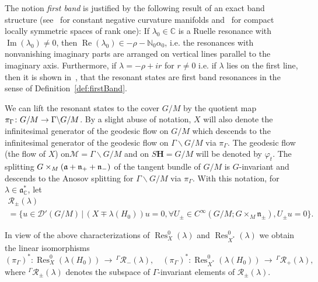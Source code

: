 \documentclass[AHL, Unicode, longabstracts, published]{cedram}
\DeclareMathOperator{\Res}{Res}
\DeclareMathOperator{\Imag}{Im}
\DeclareMathOperator{\Real}{Re}
\newcommand{\mc}{\mathcal}
\newcommand{\cc}{\mathbb{C}}
\newcommand{\bfh}{\mathbf{H}}
\newcommand{\N}{\mathbb{N}}
\renewcommand{\a}{\mathfrak a}
\let\oldforall\forall
\renewcommand*{\forall}{\mathrel{\oldforall}}
\begin{document}
\begin{rema}
The notion \emph{first band} is justified by the following result of an exact band structure (see~\cite{DFG15} for constant negative curvature manifolds and~\cite{KW19a} for compact locally symmetric spaces of rank one): If $\lambda_0\in \cc$ is a Ruelle resonance with $\Imag(\lambda_0)\neq 0$, then $\Real(\lambda_0) \in -\rho - \N_0\alpha_0$, i.e. the resonances with nonvanishing imaginary parts are arranged on vertical lines parallel to the imaginary axis. Furthermore, if $\lambda= -\rho + ir$ for $r\neq 0$ i.e. if $\lambda$ lies on the first line, then it is shown in~\cite{DFG15,KW19a}, that the resonant states are first band resonances in the sense of Definition~\ref{def:firstBand}.
\end{rema}

We can lift the resonant states to the cover $G/M$ by the quotient map $\pi_{\Gamma}\colon G/M\linebreak\to \Gamma\backslash G/M$. By a slight abuse of notation, $X$ will also denote the infinitesimal generator of the geodesic flow on $G/M$ which descends to the infinitesimal generator of the geodesic flow on $\Gamma\backslash G/M$ via $\pi_{\Gamma}$. The geodesic flow (the flow of $X$) on\linebreak$\mc{M}=\Gamma\backslash G/M$ and on $S{\bfh}=G/M$ will be denoted by $\varphi_t$. The splitting $G\times_M\linebreak(\mathfrak a +\mathfrak n_+ +\mathfrak n_-)$ of the tangent bundle of $G/M$ is $G$-invariant and descends to the Anosov splitting for $\Gamma\backslash G/M$ via $\pi_{\Gamma}$. With this notation, for $\lambda\in\a^*_\cc$, let
\begin{multline*}
\mc{R}_\pm(\lambda)\\
 = \big\{u\in \mathcal D'(G/M)\,\big| \, (X\mp \lambda(H_0))u=0,
\forall U_\pm \in C^\infty(G/M;G\times_M \mathfrak n_\pm), U_\pm u =0\big\}.
\end{multline*}

\begin{rema}\label{lem:firs_band_Gamma_inv_vectors}
In view of the above characterizations of $\Res^0_{X}(\lambda)$ and $\Res^0_{X^*}(\lambda)$ we obtain the linear isomorphisms
\[
(\pi_{\Gamma})^*:\Res_{X}^0(\lambda(H_0))\,\to\,{^\Gamma \mc{R}_-(\lambda)}, \quad (\pi_{\Gamma})^*:\Res_{X^*}^0(\lambda(H_0))\,\to\,{^\Gamma \mc{R}_+(\lambda)},
\]
where $^\Gamma \mc{R}_\pm(\lambda)$ denotes the subspace of $\Gamma$-invariant elements of $\mc{R}_\pm(\lambda)$.
\end{rema}
\end{document}
